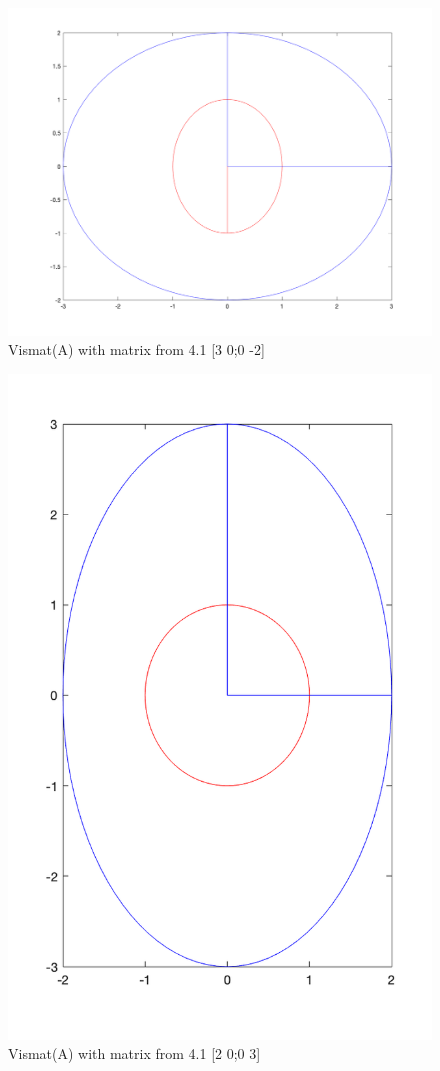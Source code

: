 \documentclass[12pt]{article}
\makeatletter
\theoremstyle{homework}
\newenvironment{exercise}[1]
{\def\@currentlabel{#1}\exercisecore}
{\endexercisecore}
\makeatother
\begin{document}
\begin{exercise}{4.3}
          \begin{figure}[H]
            \begin{center}
              \caption{Vismat(A) with matrix from 4.1 [3 0;0 -2]}
              \includegraphics[width=.75\textwidth]{plot2.png}
            \end{center}
          \end{figure}
          \begin{figure}[H]
            \begin{center}
              \caption{Vismat(A) with matrix from 4.1 [2 0;0 3]}
              \includegraphics[width=.75\textwidth]{plot3.png}

\end{center}
\end{figure}
\end{exercise}
\end{document}
